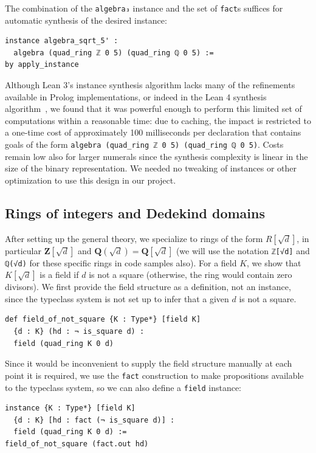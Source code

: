 \documentclass[sigplan,10pt,nonacm,
screen]{acmart} \settopmatter{printfolios=true,printccs=false,printacmref=false}
\newcommand{\QQ}{\mathbf{Q}}
\newcommand{\ZZ}{\mathbf{Z}}
\begin{document}
    The combination of the \lstinline{algebra₃} instance and the set of \lstinline{fact}s suffices for automatic synthesis of the desired instance:
\begin{lstlisting}
instance algebra_sqrt_5' :
  algebra (quad_ring ℤ 0 5) (quad_ring ℚ 0 5) :=
by apply_instance
\end{lstlisting}
Although Lean 3's instance synthesis algorithm lacks many of the refinements available in Prolog implementations, or indeed in the Lean 4 synthesis algorithm~\cite{lean-tabled-typeclasses},
we found that it was powerful enough to perform this limited set of computations within a reasonable time:
due to caching, the impact is restricted to a one-time cost of approximately 100 milliseconds per declaration
that contains goals of the form \lstinline{algebra (quad_ring ℤ 0 5) (quad_ring ℚ 0 5)}.
Costs\\ remain low also for larger numerals since the synthesis complexity is linear in the size of the binary representation.
We needed no tweaking of instances or other optimization to use this design in our project.

    \subsection{Rings of integers and Dedekind domains} \label{sec:ring_of_integers}

    After setting up the general theory, we specialize to rings of the form $R[\sqrt{d}]$,
in particular $\ZZ[\sqrt{d}]$ and $\QQ(\sqrt{d})=\QQ[\sqrt{d}]$ (we will use the notation \lstinline{ℤ[√d]} and \lstinline{ℚ(√d)} for these specific rings in code samples also).
    For a field $K$, we show that $K[\sqrt{d}]$ is a field if $d$ is not a square (otherwise, the ring would contain zero divisors).
    We first provide the field structure as a definition, not an instance, since the typeclass system is not set up to infer that a given $d$ is not a square.
\begin{lstlisting}
def field_of_not_square {K : Type*} [field K]
  {d : K} (hd : ¬ is_square d) :
  field (quad_ring K 0 d)
\end{lstlisting}
    Since it would be inconvenient to supply the field structure manually at each point it is required,
    we use the \lstinline{fact} construction to make propositions available to the typeclass system,
    so we can also define a \lstinline{field} instance:
\begin{lstlisting}
instance {K : Type*} [field K]
  {d : K} [hd : fact (¬ is_square d)] :
  field (quad_ring K 0 d) :=
field_of_not_square (fact.out hd)
\end{lstlisting}
\end{document}
